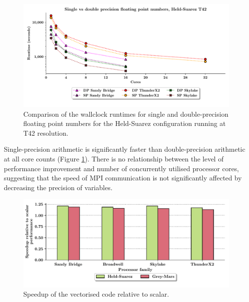 \documentclass[a4paper,11pt]{report}
\begin{document}
\par
\begin{figure}[H]
\begin{center}
\includegraphics[width=1\textwidth]{img/single-double-precision.pdf}
\caption[Performance comparison of varied precision of floating point numbers]{Comparison of the wallclock runtimes for single and double-precision floating point numbers for the Held-Suarez configuration running at T42 resolution. }
\label{fig:precision}
\end{center}
\end{figure}
\par
Single-precision arithmetic is significantly faster than double-precision arithmetic at all core counts (Figure \ref{fig:precision}). There is no relationship between the level of performance improvement and number of concurrently utilised processor cores, suggesting that the speed of MPI communication is not significantly affected by decreasing the precision of variables.
\par
\begin{figure}[htbp]
\begin{center}
\includegraphics[width=\textwidth]{img/speedup-vector-sp.pdf}
\caption{Speedup of the vectorised code relative to scalar.}
\label{fig:vec-speed-sp}
\end{center}
\end{figure}
\end{document}
